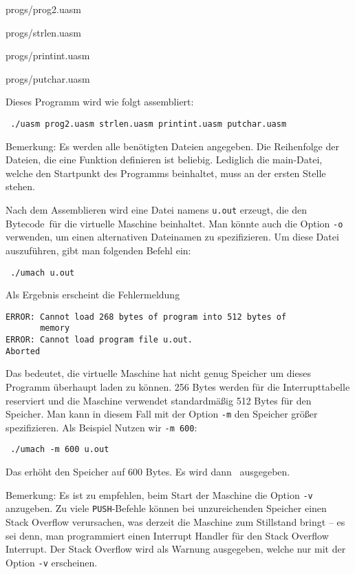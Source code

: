 
                {progs/prog2.uasm}



                {progs/strlen.uasm}



                {progs/printint.uasm}



                {progs/putchar.uasm}


Dieses Programm wird wie folgt assembliert:
\begin{lstlisting}
 ./uasm prog2.uasm strlen.uasm printint.uasm putchar.uasm
\end{lstlisting}
Bemerkung: Es werden alle benötigten Dateien angegeben. Die Reihenfolge der
Dateien, die eine Funktion definieren ist beliebig. Lediglich die
\glqq main\grqq-Datei, welche den Startpunkt des Programms beinhaltet, muss an 
der ersten Stelle stehen.

Nach dem Assemblieren wird eine Datei namens \texttt{u.out} erzeugt, die den
\glqq Bytecode\grqq\ für die virtuelle Maschine beinhaltet. Man könnte auch die
Option \texttt{-o} verwenden, um einen alternativen Dateinamen zu spezifizieren.
Um diese Datei auszuführen, gibt man folgenden Befehl ein:
\begin{lstlisting}
 ./umach u.out
\end{lstlisting}
Als Ergebnis erscheint die Fehlermeldung
\begin{lstlisting}
ERROR: Cannot load 268 bytes of program into 512 bytes of
       memory
ERROR: Cannot load program file u.out.
Aborted
\end{lstlisting}
Das bedeutet, die virtuelle Maschine hat nicht genug Speicher um dieses
Programm überhaupt laden zu können. 256 Bytes werden für die Interrupttabelle
reserviert und die Maschine verwendet standardmäßig 512 Bytes für den
Speicher. Man kann in diesem Fall mit der Option \texttt{-m} den Speicher
größer spezifizieren. Als Beispiel Nutzen wir \texttt{-m 600}:
\begin{lstlisting}
 ./umach -m 600 u.out
\end{lstlisting}
Das erhöht den Speicher auf 600 Bytes. Es wird dann \grqq\ ausgegeben.

Bemerkung: Es ist zu empfehlen, beim Start der Maschine die Option \texttt{-v}
anzugeben. Zu viele \texttt{PUSH}-Befehle können bei unzureichenden Speicher
einen Stack Overflow verursachen, was derzeit die Maschine zum Stillstand bringt
-- es sei denn, man programmiert einen Interrupt Handler für den Stack Overflow
Interrupt. Der Stack Overflow wird als Warnung ausgegeben, welche nur mit der
Option \texttt{-v} erscheinen.
